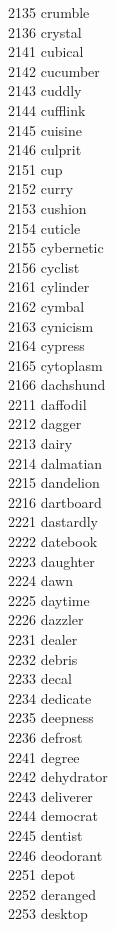 2135 crumble \\
2136 crystal \\
2141 cubical \\
2142 cucumber \\
2143 cuddly \\
2144 cufflink \\
2145 cuisine \\
2146 culprit \\
2151 cup \\
2152 curry \\
2153 cushion \\
2154 cuticle \\
2155 cybernetic \\
2156 cyclist \\
2161 cylinder \\
2162 cymbal \\
2163 cynicism \\
2164 cypress \\
2165 cytoplasm \\
2166 dachshund \\
2211 daffodil \\
2212 dagger \\
2213 dairy \\
2214 dalmatian \\
2215 dandelion \\
2216 dartboard \\
2221 dastardly \\
2222 datebook \\
2223 daughter \\
2224 dawn \\
2225 daytime \\
2226 dazzler \\
2231 dealer \\
2232 debris \\
2233 decal \\
2234 dedicate \\
2235 deepness \\
2236 defrost \\
2241 degree \\
2242 dehydrator \\
2243 deliverer \\
2244 democrat \\
2245 dentist \\
2246 deodorant \\
2251 depot \\
2252 deranged \\
2253 desktop \\
